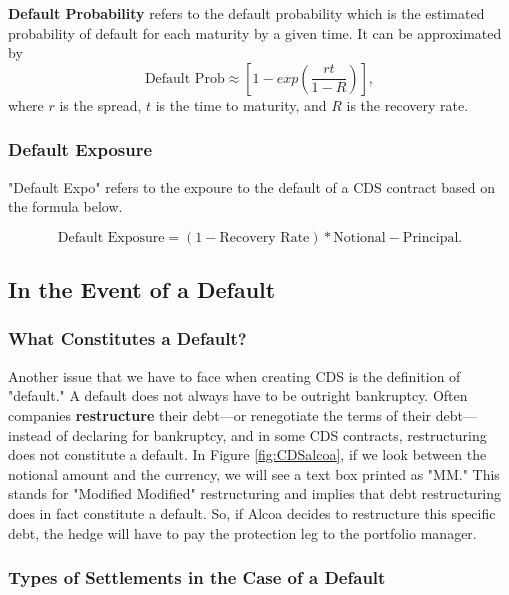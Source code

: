 \documentclass[article]{jss}
\begin{document}
\textbf{Default Probability} refers to the default probability which is the estimated probability of default for each maturity by a given time. It can be approximated by
\begin{equation}
  \text{Default Prob} \approx \left [1 - exp \left (\frac{rt}{1-R} \right ) \right ], \nonumber
\end{equation}
where $r$ is the spread, $t$ is the time to maturity, and $R$ is the recovery rate.

\subsubsection{Default Exposure}
\label{sec:DefaultExpo}

"Default Expo" refers to the expoure to the default of a CDS contract based on the formula below.

\begin{equation}
  \text{Default Exposure} = (1 - \text{Recovery Rate})*\text{Notional}
  - \text{Principal}. \nonumber
\end{equation} 

\subsection{In the Event of a Default}

\subsubsection{What Constitutes a Default?}
\label{sec:DafaultType}

Another issue that we have to face when creating CDS is the definition of "default." A default does not always have to be outright bankruptcy. Often companies \textbf{restructure} their debt---or renegotiate the terms of their debt---instead of declaring for bankruptcy, and in some CDS contracts, restructuring does not constitute a default. In Figure \ref{fig:CDSalcoa}, if we look between the notional amount and the currency, we will see a text box printed as "MM." This stands for "Modified Modified" restructuring and implies that debt restructuring does in fact constitute a default. So, if Alcoa decides to restructure this specific debt, the hedge will have to pay the protection leg to the portfolio manager.

\subsubsection{Types of Settlements in the Case of a Default}
\label{sec:SettlementType}
\end{document}
